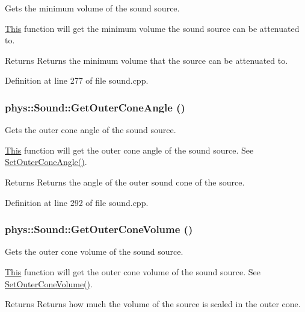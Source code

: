 Gets the minimum volume of the sound source. 

\hyperlink{structThis}{This} function will get the minimum volume the sound source can be attenuated to. \begin{DoxyReturn}{Returns}
Returns the minimum volume that the source can be attenuated to. 
\end{DoxyReturn}


Definition at line 277 of file sound.cpp.

\hypertarget{classphys_1_1Sound_ad39ca4504655a777283fd2e238b729d1}{
\subsubsection[{GetOuterConeAngle}]{ phys::Sound::GetOuterConeAngle ()}}
\label{dc/d2f/classphys_1_1Sound_ad39ca4504655a777283fd2e238b729d1}


Gets the outer cone angle of the sound source. 

\hyperlink{structThis}{This} function will get the outer cone angle of the sound source. See \hyperlink{classphys_1_1Sound_a4fc7d07d303ddb97acc15524950d0442}{SetOuterConeAngle()}. \begin{DoxyReturn}{Returns}
Returns the angle of the outer sound cone of the source. 
\end{DoxyReturn}


Definition at line 292 of file sound.cpp.

\hypertarget{classphys_1_1Sound_a2607037d0c40d32f402d0ebb98586a00}{
\subsubsection[{GetOuterConeVolume}]{ phys::Sound::GetOuterConeVolume ()}}
\label{dc/d2f/classphys_1_1Sound_a2607037d0c40d32f402d0ebb98586a00}


Gets the outer cone volume of the sound source. 

\hyperlink{structThis}{This} function will get the outer cone volume of the sound source. See \hyperlink{classphys_1_1Sound_a55b0eadd492fc1a5fbae9848f5682ac9}{SetOuterConeVolume()}. \begin{DoxyReturn}{Returns}
Returns how much the volume of the source is scaled in the outer cone. 
\end{DoxyReturn}


